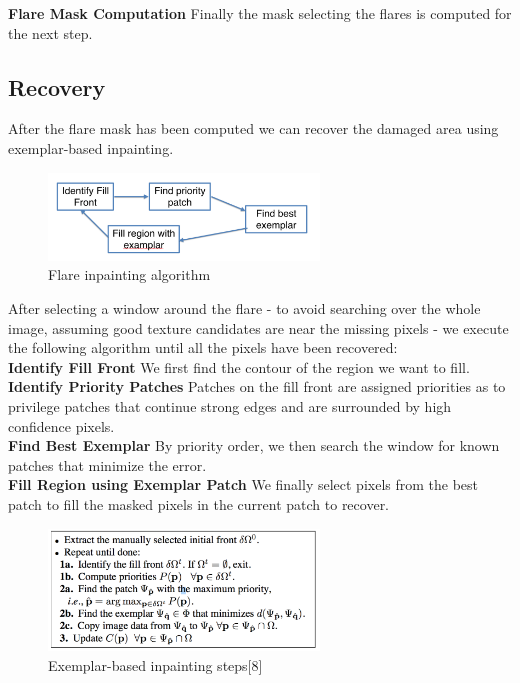 \documentclass[11pt,twocolumn]{article}
\begin{document}
\textbf{Flare Mask Computation} Finally the mask selecting the flares is computed for the next step.

\subsection{Recovery}

After the flare mask has been computed we can recover the damaged area using exemplar-based inpainting.

\begin{figure}[ht!]
\centering
\includegraphics[width=72mm]{flow_inpainting.png}
\caption{Flare inpainting algorithm}
\end{figure}

After selecting a window around the flare - to avoid searching over the whole image, assuming good texture candidates are near the missing pixels - we execute the following algorithm until all the pixels have been recovered:
\\

\textbf{Identify Fill Front} We first find the contour of the region we want to fill.
\\

\textbf{Identify Priority Patches} Patches on the fill front are assigned priorities as to privilege patches that continue strong edges and are surrounded by high confidence pixels.
\\

\textbf{Find Best Exemplar} By priority order, we then search the window for known patches that minimize the error.
\\

\textbf{Fill Region using Exemplar Patch} We finally select pixels from the best patch to fill the masked pixels in the current patch to recover.

\begin{figure}[ht!]
\centering
\includegraphics[width=72mm]{algo_inpainting.png}
\caption{Exemplar-based inpainting steps[8]}
\end{figure}
\end{document}
